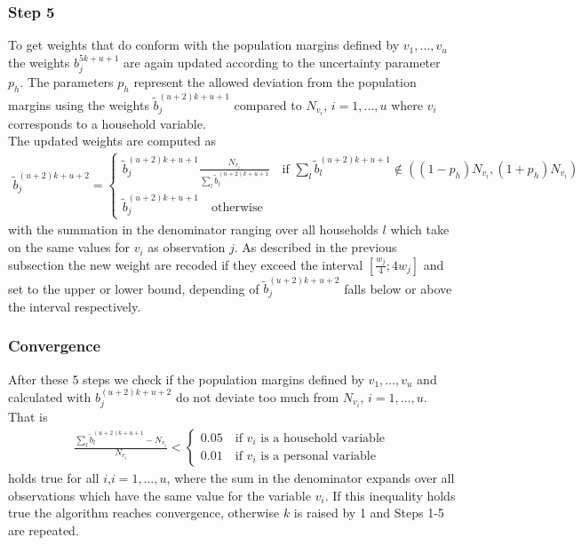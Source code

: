 \documentclass{scrartcl}\usepackage[]{graphicx}\usepackage[]{color}
\begin{document}
\subsubsection{Step 5}
To get weights that do conform with the population margins defined by $v_1,\ldots,v_u$ the weights $b_j^{5k+u+1}$ are again updated according to the uncertainty parameter $p_h$. The parameters $p_h$ represent the allowed deviation from the population margins using the weights $\tilde{b}_j^{(u+2)k+u+1}$ compared to $N_{v_i}$, $i=1,\ldots,u$ where $v_i$ corresponds to a household variable.\\
The updated weights are computed as
\begin{align*}
  \tilde{b}_j^{(u+2)k+u+2} =
  \begin{cases}
    \tilde{b}_j^{(u+2)k+u+1}\frac{N_{v_i}}{\sum\limits_{l} \tilde{b}_l^{(u+2)k+u+1}} \quad \text{if } \sum\limits_{l} \tilde{b}_l^{(u+2)k+u+1} \notin ((1-p_h)N_{v_i},(1+p_h)N_{v_i}) \\
    \tilde{b}_j^{(u+2)k+u+1} \quad \text{otherwise}
  \end{cases}
\end{align*}
with the summation in the denominator ranging over all households $l$ which take on the same values for $v_i$ as observation $j$. As described in the previous subsection the new weight are recoded if they exceed the interval $[\frac{w_j}{4};4w_j]$ and set to the upper or lower bound, depending of $\tilde{b}_j^{(u+2)k+u+2}$ falls below or above the interval respectively.

\subsubsection{Convergence}
After these 5 steps we check if the population margins defined by $v_1,\ldots,v_u$ and calculated with $b_j^{(u+2)k+u+2}$ do not deviate too much from $N_{v_i}$, $i=1,\ldots,u$. That is
\begin{align*}
  \frac{\sum\limits_{l} \tilde{b}_l^{(u+2)k+u+1} - N_{v_i}}{N_{v_i}} <
  \begin{cases}
  0.05 \quad\text{if }v_i\text{ is a household variable}\\
  0.01 \quad\text{if }v_i\text{ is a personal variable}
  \end{cases}
\end{align*}
holds true for all $i$,$i=1,\ldots,u$, where the sum in the denominator expands over all observations which have the same value for the variable $v_i$.
If this inequality holds true the algorithm reaches convergence, otherwise $k$ is raised by 1 and Steps 1-5 are repeated.
\end{document}

